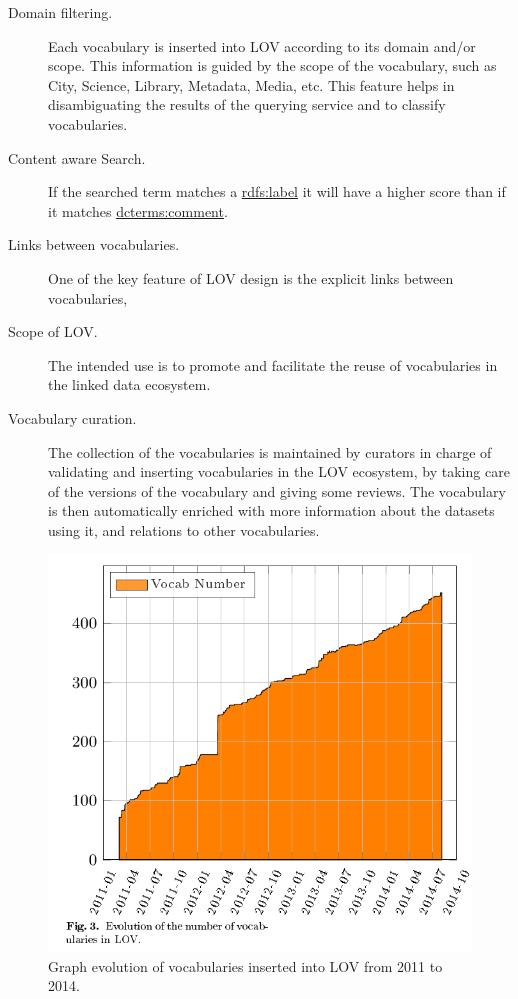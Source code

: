 \documentclass{iosart2c}
\begin{document}
 \begin{description}
	\item [Domain filtering.] Each vocabulary is inserted into LOV according to its domain and/or scope. This information is guided by the scope of the vocabulary, such as City, Science, Library, Metadata, Media, etc. This feature helps in disambiguating the results of the querying service and to classify vocabularies.
	\item [Content aware Search.] If the searched term matches a \url{rdfs:label} it will have a higher score than if it matches \url{dcterms:comment}.
	\item [Links between vocabularies.] One of the key feature of LOV design is the explicit links between vocabularies,
	 \item [Scope of LOV.]The intended use is to promote and facilitate the reuse of vocabularies in the linked data ecosystem.
	 \item [Vocabulary curation.]The collection of the vocabularies is maintained by curators in charge of validating and inserting vocabularies in the LOV ecosystem, by taking care of the versions of the vocabulary and giving some reviews. The vocabulary is then automatically enriched with more information about the datasets using it, and relations to other vocabularies.
 \end{description}


\begin{figure}[h!tb]
\centering
  \includegraphics[width=\linewidth]{LOVEvol.png}
  \caption{Graph evolution of vocabularies inserted into LOV from 2011 to 2014.}
  \label{fig:translations}
\end{figure}
\end{document}
